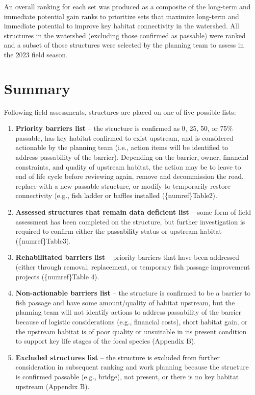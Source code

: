 \documentclass[
  letterpaper,
  DIV=11,
  numbers=noendperiod]{scrreprt}
\begin{document}
An overall ranking for each set was produced as a composite of the
long-term and immediate potential gain ranks to prioritize sets that
maximize long-term and immediate potential to improve key habitat
connectivity in the watershed. All structures in the watershed
(excluding those confirmed as passable) were ranked and a subset of
those structures were selected by the planning team to assess in the
2023 field season.

\section*{Summary}\label{summary}


Following field assessments, structures are placed on one of five
possible lists:

\begin{enumerate}
\def\labelenumi{\arabic{enumi}.}
\item
  \textbf{Priority barriers list} -- the structure is confirmed as 0,
  25, 50, or 75\% passable, has key habitat confirmed to exist upstream,
  and is considered actionable by the planning team (i.e., action items
  will be identified to address passability of the barrier). Depending
  on the barrier, owner, financial constraints, and quality of upstream
  habitat, the action may be to leave to end of life cycle before
  reviewing again, remove and decommission the road, replace with a new
  passable structure, or modify to temporarily restore connectivity
  (e.g., fish ladder or baffles installed (\{numref\}Table2).
\item
  \textbf{Assessed structures that remain data deficient list} -- some
  form of field assessment has been completed on the structure, but
  further investigation is required to confirm either the passability
  status or upstream habitat (\{numref\}Table3).
\item
  \textbf{Rehabilitated barriers list} -- priority barriers that have
  been addressed (either through removal, replacement, or temporary fish
  passage improvement projects (\{numref\}Table 4).
\item
  \textbf{Non-actionable barriers list} -- the structure is confirmed to
  be a barrier to fish passage and have some amount/quality of habitat
  upstream, but the planning team will not identify actions to address
  passability of the barrier because of logistic considerations (e.g.,
  financial costs), short habitat gain, or the upstream habitat is of
  poor quality or unsuitable in its present condition to support key
  life stages of the focal species (Appendix B).
\item
  \textbf{Excluded structures list} -- the structure is excluded from
  further consideration in subsequent ranking and work planning because
  the structure is confirmed passable (e.g., bridge), not present, or
  there is no key habitat upstream (Appendix B).
\end{enumerate}
\end{document}
